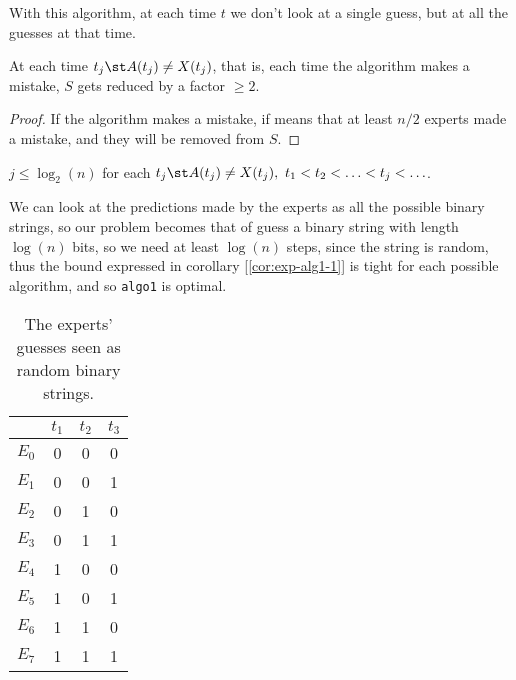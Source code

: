 \obs With this algorithm, at each time $t$ we don't look at a single guess, but at all the guesses at that time.

\begin{lem}\label{lem:exp-alg1-1}
    At each time $t_j \st A(t_j) \neq X(t_j)$, that is, each time the algorithm makes a mistake, $S$ gets reduced by a factor $\geq 2$.
\end{lem}
\begin{proof}
    If the algorithm makes a mistake, if means that at least $n/2$ experts made a mistake, and they will be removed from $S$.
\end{proof}

\begin{cor}\label{cor:exp-alg1-1}
    $j \leq \log_2(n)$ for each $t_j \st A(t_j) \neq X(t_j),\ t_1 < t_2 < \ldots < t_j < \ldots$.
\end{cor}

\begin{obs}
    We can look at the predictions made by the experts as all the possible binary strings, so our problem becomes that of guess a binary string with length $\log(n)$ bits, so we need at least $\log(n)$ steps, since the string is random, thus the bound expressed in corollary [\ref{cor:exp-alg1-1}] is tight for each possible algorithm, and so \texttt{algo1} is optimal.
    
    \begin{table}[ht]
        \centering
        \begin{tabular}{c|c|c|c}
            & $t_1$ & $t_2$ & $t_3$ \\ \hline
            $E_0$ & 0     & 0     & 0     \\
            $E_1$ & 0     & 0     & 1     \\
            $E_2$ & 0     & 1     & 0     \\
            $E_3$ & 0     & 1     & 1     \\
            $E_4$ & 1     & 0     & 0     \\
            $E_5$ & 1     & 0     & 1     \\
            $E_6$ & 1     & 1     & 0     \\
            $E_7$ & 1     & 1     & 1    
        \end{tabular}
        \caption{The experts' guesses seen as random binary strings.}
        \label{tab:exp-alg1-strings}
    \end{table}
\end{obs}


